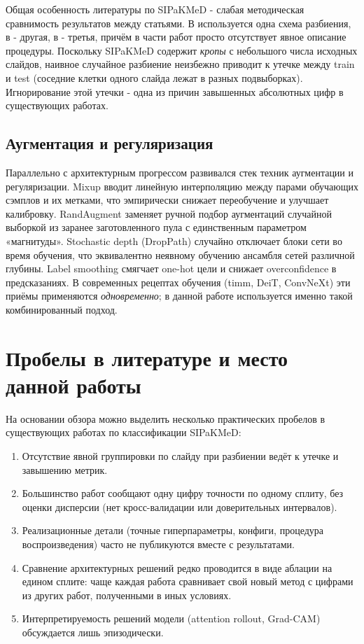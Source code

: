\documentclass[14pt,a4paper]{extreport}
\begin{document}
Общая особенность литературы по SIPaKMeD - слабая методическая
сравнимость результатов между статьями. В \cite{plissiti2018sipakmed}
используется одна схема разбиения, в \cite{cerviformer2023} - другая, в
\cite{hybridvit2025} - третья, причём в части работ просто отсутствует
явное описание процедуры. Поскольку SIPaKMeD содержит \textit{кропы} с
небольшого числа исходных слайдов, наивное случайное разбиение неизбежно
приводит к утечке между train и test (соседние клетки одного слайда
лежат в разных подвыборках). Игнорирование этой утечки - одна из
причин завышенных абсолютных цифр в существующих работах.

\subsection{Аугментация и регуляризация}

Параллельно с архитектурным прогрессом развивался стек техник аугментации
и регуляризации. Mixup \cite{zhang2018mixup} вводит линейную интерполяцию
между парами обучающих сэмплов и их метками, что эмпирически снижает
переобучение и улучшает калибровку. RandAugment \cite{cubuk2020randaugment}
заменяет ручной подбор аугментаций случайной выборкой из заранее
заготовленного пула с единственным параметром «магнитуды».
Stochastic depth (DropPath) \cite{huang2016deep} случайно отключает
блоки сети во время обучения, что эквивалентно неявному обучению ансамбля
сетей различной глубины. Label smoothing смягчает one-hot цели и
снижает overconfidence в предсказаниях. В современных рецептах обучения
(timm, DeiT, ConvNeXt) эти приёмы применяются \textit{одновременно}; в
данной работе используется именно такой комбинированный подход.

\section{Пробелы в литературе и место данной работы}

На основании обзора можно выделить несколько практических пробелов в
существующих работах по классификации SIPaKMeD:
\begin{enumerate}
    \item Отсутствие явной группировки по слайду при разбиении ведёт к
          утечке и завышению метрик.
    \item Большинство работ сообщают одну цифру точности по одному
          сплиту, без оценки дисперсии (нет кросс-валидации или
          доверительных интервалов).
    \item Реализационные детали (точные гиперпараметры, конфиги,
          процедура воспроизведения) часто не публикуются вместе с
          результатами.
    \item Сравнение архитектурных решений редко проводится в виде
          аблации на едином сплите: чаще каждая работа сравнивает свой
          новый метод с цифрами из других работ, полученными в иных
          условиях.
    \item Интерпретируемость решений модели (attention rollout,
          Grad-CAM) обсуждается лишь эпизодически.
\end{enumerate}
\end{document}
